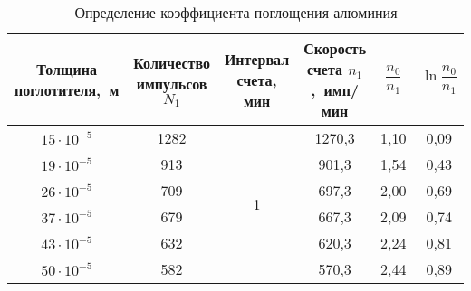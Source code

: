 \documentclass[10pt,pscyr,nonums]{hedlab}
\begin{document}
  \pagebreak
  
  \begin{table}[h!]
    \center
    \caption{Определение коэффициента поглощения алюминия}
    \begin{tabular}{|*{6}{C{.13}|}} \hline
      Толщина поглотителя,~м &
        Количество импульсов \( N_1 \) &
        Интервал счета, мин &
        Скорость счета \( n_1 \),~имп/мин &
        \( \dfrac{n_0}{n_1} \) &
        \( \ln\dfrac{n_0}{n_1} \) \\ \hline
      \( 15 \cdot 10^{-5} \) & 1282 &  &
        1270,3 & 1,10 & 0,09 \\ 
      \( 19 \cdot 10^{-5} \) & 913 &&
        901,3  & 1,54 & 0,43 \\ 
      \( 26 \cdot 10^{-5} \) & 709 &&
        697,3  & 2,00 & 0,69 \\ 
      \( 37 \cdot 10^{-5} \) & 679 &&
        667,3  & 2,09 & 0,74 \\ 
      \( 43 \cdot 10^{-5} \) & 632 &&
        620,3  & 2,24 & 0,81 \\ 
      \( 50 \cdot 10^{-5} \) & 582 &&
        570,3  & 2,44 & 0,89 \\ \hline
    \end{tabular}
  \end{table}
\end{document}
